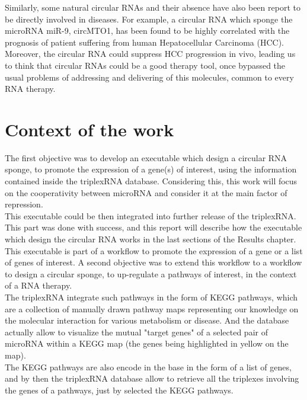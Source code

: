 \documentclass[a4paper,12pt]{report}
\begin{document}
Similarly, some natural circular RNAs and their absence have also been report to be directly involved in diseases. For example, a circular RNA which sponge the microRNA miR-9, circMTO1, has been found to be highly  correlated with the prognosis of patient suffering from human Hepatocellular Carcinoma (HCC)\cite{carcinoma}. Moreover, the circular RNA could suppress HCC progression in vivo\cite{carcinoma}, leading us to think that circular RNAs could be a good therapy tool, once bypassed the usual problems of addressing and delivering of this molecules, common to every RNA therapy\cite{therapeutics}.


\section{Context of the work}

The first objective was to develop an executable which design a circular RNA sponge, to promote the expression of a gene(s) of interest, using the information contained inside the triplexRNA database. Considering this, this work will focus on the cooperativity between microRNA and consider it at the main factor of repression.\\ 

This executable could be then integrated into further release of the triplexRNA. This part was done with success, and this report will describe how the executable which design the circular RNA works in the last sections of the Results chapter.\\

This executable is part of a workflow to promote the expression of a gene or a list of genes of interest. A second objective was to extend this workflow to a workflow to design a circular sponge, to up-regulate a pathways of interest, in the context of a RNA therapy.\\

The triplexRNA integrate such pathways in the form of KEGG pathways, which are a collection of manually drawn pathway maps representing our knowledge on the molecular interaction for various metabolism or disease\cite{KEGG}. And the database actually allow to visualize the mutual "target genes" of a selected pair of microRNA within a KEGG map (the genes being highlighted in yellow on the map).\\

The KEGG pathways are also encode in the base in the form of a list of genes, and by then the triplexRNA database allow to retrieve all the triplexes involving the genes of a pathways, just by selected the KEGG pathways.\\
\end{document}
